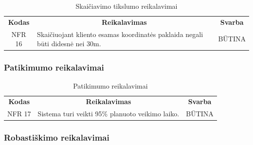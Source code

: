 \documentclass{VUMIFPSkursinis}
\begin{document}
{{{{{\begin{center}
	\begin{table}[H]
	\caption{Skaičiavimo tikslumo reikalavimai}
	\begin{tabular}{|p{2cm}|p{}|p{}|}
	\hline
	    \rowcolor{lightgray}
		\multicolumn{3}{|c|}{Skaičiavimo tikslumo reikalavimai}\\
		
	\hline
		\multicolumn{1}{|c|}{{\bfseries Kodas}}&
		\multicolumn{1}{|c|}{{\bfseries Reikalavimas}}&
		\multicolumn{1}{|c|}{{\bfseries Svarba}}\\
	\hline 	
		\multicolumn{1}{|c|}{NFR 16}&
		{Skaičiuojant kliento esamas koordinatės paklaida negali būti didesnė nei 30m.}&
		\multicolumn{1}{|c|}{BŪTINA}\\	
	\hline 	 	 	
	\end{tabular}
	
	\label{table:Skaičiavimotikslumoreikalavimai}
	\end{table}

\end{center}

\subsubsection{Patikimumo reikalavimai}

\begin{center}
	\begin{table}[H]
	\caption{Patikimumo reikalavimai}
	\begin{tabular}{|p{2cm}|p{}|p{}|}
	\hline
	    \rowcolor{lightgray}
		\multicolumn{3}{|c|}{Patikimumo reikalavimai}\\
		
	\hline
		\multicolumn{1}{|c|}{{\bfseries Kodas}}&
		\multicolumn{1}{|c|}{{\bfseries Reikalavimas}}&
		\multicolumn{1}{|c|}{{\bfseries Svarba}}\\
	\hline 	
		\multicolumn{1}{|c|}{NFR 17}&
		{Sistema turi veikti 95\% planuoto veikimo laiko. }&
		\multicolumn{1}{|c|}{BŪTINA}\\	
	\hline 	 	 	
	\end{tabular}
	
	\label{table:Patikimumoreikalavimai}
	\end{table}

\end{center}



\subsubsection{Robastiškimo reikalavimai}

}}}}}
\end{document}
